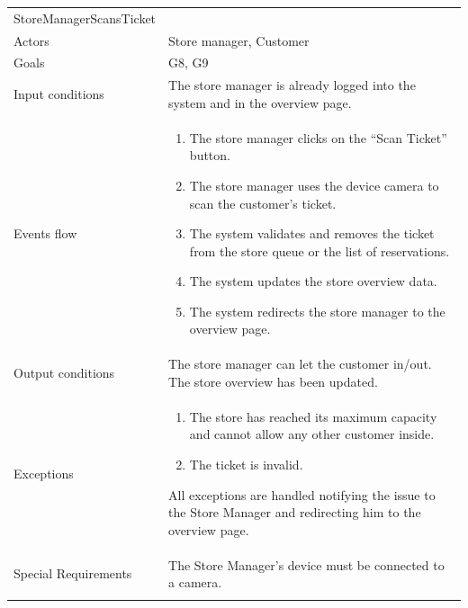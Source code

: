 \begin{longtable}[]{@{}
  >{\raggedright\arraybackslash}p{}
  >{\raggedright\arraybackslash}p{}@{}}
\toprule
StoreManagerScansTicket & \\ \addlinespace
\midrule
\endhead
Actors & Store manager, Customer \\ \addlinespace
Goals & G8, G9 \\ \addlinespace
Input conditions & The store manager is already logged into the system and in the overview page. \\ \addlinespace
Events flow & \begin{enumerate}\vspace{-1.35\baselineskip}
    \item The store manager clicks on the ``Scan Ticket'' button.
    \item The store manager uses the device camera to scan the customer's ticket.
    \item The system validates and removes the ticket from the store queue or the list of reservations.
    \item The system updates the store overview data.
    \item The system redirects the store manager to the overview page. 
\vspace{-1.0\baselineskip}\end{enumerate} \\ \addlinespace
Output conditions & The store manager can let the customer in/out. The store overview has been updated. \\ \addlinespace
Exceptions & \begin{enumerate}\vspace{-1.35\baselineskip}
    \item The store has reached its maximum capacity and cannot allow any other customer inside.
    \item The ticket is invalid.
\end{enumerate} All exceptions are handled notifying the issue to the Store Manager and redirecting him to the overview page. \\ \addlinespace
Special Requirements & The Store Manager's device must be connected to a camera. \\ \addlinespace
\bottomrule
\end{longtable}

